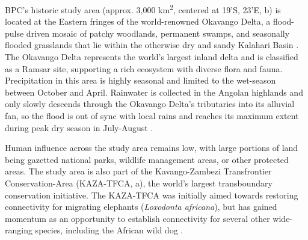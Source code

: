 \documentclass[../FinalThesis.tex]{subfiles}
\begin{document}
BPC's historic study area (approx. 3,000 km\textsuperscript{2}, centered at
19'S, 23'E, b) is located at
the Eastern fringes of the world-renowned Okavango Delta, a flood-pulse driven
mosaic of patchy woodlands, permanent swamps, and seasonally flooded grasslands
that lie within the otherwise dry and sandy Kalahari Basin \citep{Wilson.1976,
Ramberg.2006, Mendelsohn.2010}. The Okavango Delta represents the world's
largest inland delta and is classified as a Ramsar site, supporting a rich
ecosystem with diverse flora and fauna. Precipitation in this area is highly
seasonal and limited to the wet-season between October and April. Rainwater is
collected in the Angolan highlands and only slowly descends through the Okavango
Delta's tributaries into its alluvial fan, so the flood is out of sync with
local rains and reaches its maximum extent during peak dry season in July-August
\citep{Wolski.2017}.

Human influence across the study area remains low, with large portions of land
being gazetted national parks, wildlife management areas, or other protected
areas. The study area is also part of the Kavango-Zambezi Transfrontier
Conservation-Area (KAZA-TFCA, a), the world's largest
transboundary conservation initiative. The KAZA-TFCA was initially aimed towards
restoring connectivity for migrating elephants (\textit{Loxodonta africana}),
but has gained momentum as an opportunity to establish connectivity for several
other wide-ranging species, including the African wild dog \citep{Brennan.2020,
Hofmann.2021, Sandoval-Seres.2022}.
\end{document}
